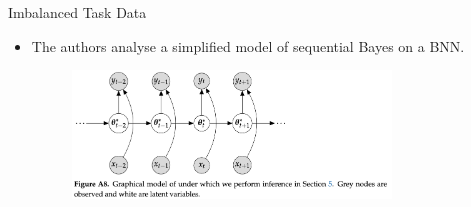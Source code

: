 \documentclass[12pt,aspectratio=169, handout]{beamer}
\let\olditem\item
\renewcommand\item{\olditem\justifying}
\begin{document}
\begin{frame}{Imbalanced Task Data}
    



    \begin{itemize}[<+->]
        \item The authors analyse a simplified model of sequential Bayes on a BNN.
        \begin{figure}
    		\centering
    		\includegraphics[width=0.8\textwidth]{"images/FigA8_full.png"}
    	\end{figure}
    \end{itemize}

\end{frame}
\end{document}
